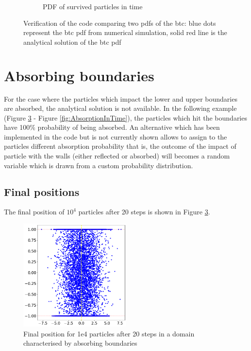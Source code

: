 \documentclass{article}
\begin{document}
\begin{figure}[htbp]
\begin{subfigure}[b]{0.45\textwidth}
        \caption{PDF of survived particles in time}
        \label{fig:subplotLivePart}
    \end{subfigure}
    \caption{Verification of the code comparing two pdfs of the btc: blue dots represent the btc pdf from numerical simulation, solid red line is the analytical solution of the btc pdf}
    \label{fig:Degradation}
\end{figure}

\FloatBarrier  %
\section{Absorbing boundaries}
For the case where the particles which impact the lower and upper boundaries are absorbed, the analytical solution is not available. In the following example (Figure \ref{fig:finalPos} - Figure \ref{fig:AbsorptionInTime}), the particles which hit the boundaries have 100\% probability of being absorbed. An alternative which has been implemented in the code but is not currently shown allows to assign to the particles different absorption probability that is, the outcome of the impact of particle with the walls (either reflected or absorbed) will becomes a random variable which is drawn from a custom probability distribution.

\FloatBarrier  %
\subsection{Final positions}
The final position of $10^4$ particles after 20 steps is shown in Figure \ref{fig:finalPos}.
\begin{figure}[h]
    \centering
    \includegraphics[width=0.5\textwidth]{images/finalPositions.png}
    \caption{Final position for 1e4 particles after 20 steps in a domain characterised by absorbing boundaries}
    \label{fig:finalPos}
\end{figure}
\end{document}
